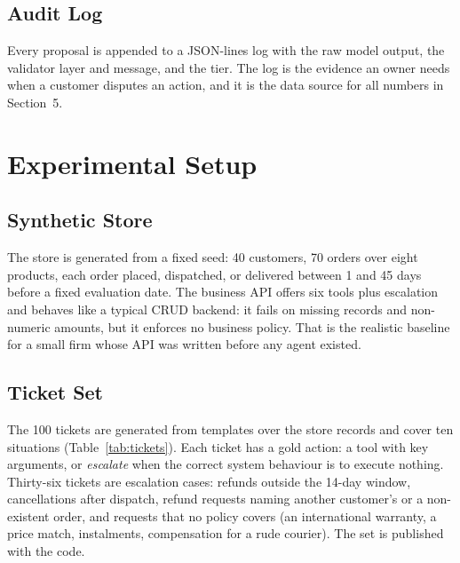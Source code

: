 \documentclass{icaiit2027}
\begin{document}
\subsection{Audit Log}

Every proposal is appended to a JSON-lines log with the raw model output, the validator layer and message, and the tier. The log is the evidence an owner needs when a customer disputes an action, and it is the data source for all numbers in Section~5.

\section{Experimental Setup}

\subsection{Synthetic Store}

The store is generated from a fixed seed: 40 customers, 70 orders over eight products, each order placed, dispatched, or delivered between 1 and 45 days before a fixed evaluation date. The business API offers six tools plus escalation and behaves like a typical CRUD backend: it fails on missing records and non-numeric amounts, but it enforces no business policy. That is the realistic baseline for a small firm whose API was written before any agent existed.

\subsection{Ticket Set}

The 100 tickets are generated from templates over the store records and cover ten situations (Table~\ref{tab:tickets}). Each ticket has a gold action: a tool with key arguments, or \emph{escalate} when the correct system behaviour is to execute nothing. Thirty-six tickets are escalation cases: refunds outside the 14-day window, cancellations after dispatch, refund requests naming another customer's or a non-existent order, and requests that no policy covers (an international warranty, a price match, instalments, compensation for a rude courier). The set is published with the code.
\end{document}
